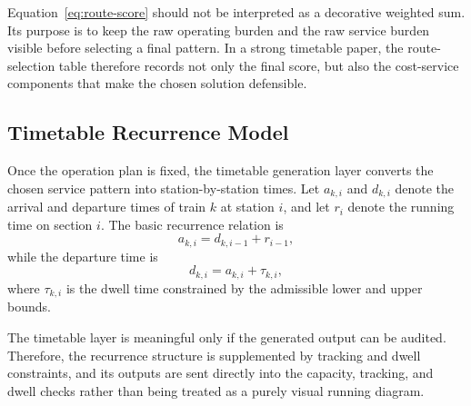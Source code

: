 Equation~\eqref{eq:route-score} should not be interpreted as a decorative weighted sum. Its purpose is to keep the raw operating burden and the raw service burden visible before selecting a final pattern. In a strong timetable paper, the route-selection table therefore records not only the final score, but also the cost-service components that make the chosen solution defensible.

\subsection{Timetable Recurrence Model}

Once the operation plan is fixed, the timetable generation layer converts the chosen service pattern into station-by-station times. Let $a_{k,i}$ and $d_{k,i}$ denote the arrival and departure times of train $k$ at station $i$, and let $r_i$ denote the running time on section $i$. The basic recurrence relation is
\begin{equation}
a_{k,i} = d_{k,i-1} + r_{i-1},
\label{eq:arrival-recurrence}
\end{equation}
while the departure time is
\begin{equation}
d_{k,i} = a_{k,i} + \tau_{k,i},
\label{eq:departure-recurrence}
\end{equation}
where $\tau_{k,i}$ is the dwell time constrained by the admissible lower and upper bounds.

The timetable layer is meaningful only if the generated output can be audited. Therefore, the recurrence structure is supplemented by tracking and dwell constraints, and its outputs are sent directly into the capacity, tracking, and dwell checks rather than being treated as a purely visual running diagram.
